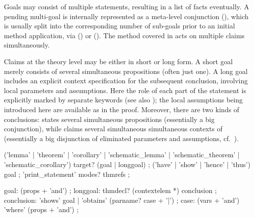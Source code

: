 \begin{isabellebody}
\begin{isamarkuptext}
  Goals may consist of multiple statements, resulting in a list of
  facts eventually.  A pending multi-goal is internally represented as
  a meta-level conjunction (\isa{{\isachardoublequote}{\isacharampersand}{\isacharampersand}{\isacharampersand}{\isachardoublequote}}), which is usually
  split into the corresponding number of sub-goals prior to an initial
  method application, via \hyperlink{command.proof}{\mbox{}}
  () or \hyperlink{command.apply}{\mbox{}}
  ().  The \hyperlink{method.induct}{\mbox{}} method
  covered in  acts on multiple claims
  simultaneously.

  Claims at the theory level may be either in short or long form.  A
  short goal merely consists of several simultaneous propositions
  (often just one).  A long goal includes an explicit context
  specification for the subsequent conclusion, involving local
  parameters and assumptions.  Here the role of each part of the
  statement is explicitly marked by separate keywords (see also
  ); the local assumptions being introduced here
  are available as \hyperlink{fact.assms}{\mbox{}} in the proof.  Moreover, there
  are two kinds of conclusions: \hypertarget{element.shows}{\hyperlink{element.shows}{\mbox{}}} states several
  simultaneous propositions (essentially a big conjunction), while
  \hypertarget{element.obtains}{\hyperlink{element.obtains}{\mbox{}}} claims several simultaneous simultaneous
  contexts of (essentially a big disjunction of eliminated parameters
  and assumptions, cf.\ ).

  \begin{rail}
    ('lemma' | 'theorem' | 'corollary' |
     'schematic\_lemma' | 'schematic\_theorem' | 'schematic\_corollary') target? (goal | longgoal)
    ;
    ('have' | 'show' | 'hence' | 'thus') goal
    ;
    'print\_statement' modes? thmrefs
    ;
  
    goal: (props + 'and')
    ;
    longgoal: thmdecl? (contextelem *) conclusion
    ;
    conclusion: 'shows' goal | 'obtains' (parname? case + '|')
    ;
    case: (vars + 'and') 'where' (props + 'and')
    ;
  \end{rail}


\end{isamarkuptext}
\end{isabellebody}
